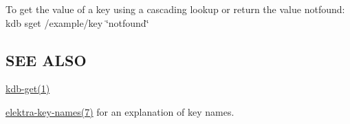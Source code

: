 To get the value of a key using a cascading lookup or return the value {\ttfamily notfound}\+:~\newline
 {\ttfamily kdb sget /example/key \char`\"{}notfound\char`\"{}}

\subsection*{S\+EE A\+L\+SO}


\begin{DoxyItemize}
\item \hyperlink{doc_help_kdb-get_md}{kdb-\/get(1)}
\item \hyperlink{doc_help_elektra-key-names_md}{elektra-\/key-\/names(7)} for an explanation of key names. 
\end{DoxyItemize}